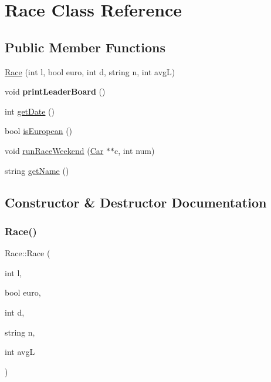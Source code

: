 \hypertarget{classRace}{}\section{Race Class Reference}
\label{classRace}
\subsection*{Public Member Functions}
\begin{DoxyCompactItemize}
\item 
\hyperlink{classRace_aac8d492b10c760c0fb0a5e0b0e013dca}{Race} (int l, bool euro, int d, string n, int avgL)
\item 
\mbox{\label{classRace_a137e1b46846619d85d1fd5af06cb9a44}} 
void {\bfseries print\+Leader\+Board} ()
\item 
int \hyperlink{classRace_ac8130e3ce8bc18a208071937058100c9}{get\+Date} ()
\item 
bool \hyperlink{classRace_a1fb45997b626b183e86e1726d91d1263}{is\+European} ()
\item 
void \hyperlink{classRace_a3ebb8fd22b1873fa3bb4d9df0bd839a3}{run\+Race\+Weekend} (\hyperlink{classCar}{Car} $\ast$$\ast$c, int num)
\item 
string \hyperlink{classRace_a8375cd2498a798c9a25c8459768b1ee8}{get\+Name} ()
\end{DoxyCompactItemize}


\subsection{Constructor \& Destructor Documentation}
\mbox{\label{classRace_aac8d492b10c760c0fb0a5e0b0e013dca}} 
\subsubsection{\texorpdfstring{Race()}{Race()}}
{\footnotesize\ttfamily Race\+::\+Race (\begin{DoxyParamCaption}\item[{int}]{l,  }\item[{bool}]{euro,  }\item[{int}]{d,  }\item[{string}]{n,  }\item[{int}]{avgL }\end{DoxyParamCaption})}


